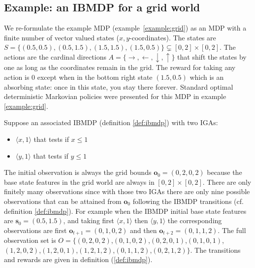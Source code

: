 \subsection{Example: an IBMDP for a grid world}
We re-formulate the example MDP (example~\ref{example:grid}) as an MDP with a finite number of vector valued states ($x,y$-coordinates).
The states are $S = \{(0.5, 0.5), (0.5, 1.5), (1.5, 1.5), (1.5, 0.5)\}\subsetneq [0, 2] \times [0, 2]$.
The actions are the cardinal directions $A = \{\rightarrow, \leftarrow, \downarrow, \uparrow\}$ that shift the states by one as long as the coordinates remain in the grid.
The reward for taking any action is 0 except when in the bottom right state $(1.5, 0.5)$ which is an absorbing state: once in this state, you stay there forever. 
Standard optimal deterministic Markovian policies were presented for this MDP in example \ref{example:grid}.

Suppose an associated IBMDP (definition \ref{def:ibmdp}) with two IGAs:
\begin{itemize}
    \item $\langle x, 1\rangle$ that tests if $x\leq 1$
    \item $\langle y, 1\rangle$ that tests if $y\leq 1$
\end{itemize}
The initial observation is always the grid bounds $\boldsymbol{o}_0=(0, 2, 0, 2)$ because the base state features in the grid world are always in $[0, 2] \times [0, 2]$.
There are only finitely many observations since with those two IGAs there are only nine possible observations that can be attained from $\boldsymbol{o}_0$ following the IBMDP transitions (cf. definition \ref{def:ibmdp}).
For example when the IBMDP initial base state features are $\boldsymbol{s}_0 = (0.5, 1.5)$, and taking first $\langle x, 1\rangle$ then $\langle y, 1\rangle$ the corresponding observations are first $\boldsymbol{o}_{t+1} = (0, 1, 0, 2)$ and then $\boldsymbol{o}_{t+2} = (0, 1, 1, 2)$.
The full observation set is $O = \{(0, 2, 0, 2)$,$(0, 1, 0, 2)$,$(0, 2, 0, 1)$,$(0, 1, 0, 1)$,$(1, 2, 0, 2)$,$(1, 2, 0, 1)$,$(1, 2, 1, 2)$,$(0, 1, 1, 2)$,$(0, 2, 1, 2)\}$.
The transitions and rewards are given in definition (\ref{def:ibmdp}).

